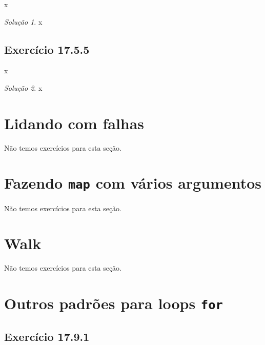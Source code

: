 \documentclass[
]{latex/krantz}
\theoremstyle{definition}
\theoremstyle{definition}
\theoremstyle{definition}
\theoremstyle{definition}
\theoremstyle{remark}
\newtheorem*{solution}{Solução}
\begin{document}
x

\begin{solution}
x
\end{solution}

\hypertarget{exr17-5-5}{%
\subsection*{Exercício 17.5.5}\label{exr17-5-5}}

x

\begin{solution}
x
\end{solution}

\hypertarget{lidando-com-falhas}{%
\section{Lidando com falhas}\label{lidando-com-falhas}}

Não temos exercícios para esta seção.

\hypertarget{fazendo-map-com-vuxe1rios-argumentos}{%
\section{\texorpdfstring{Fazendo \texttt{map} com vários argumentos}{Fazendo map com vários argumentos}}\label{fazendo-map-com-vuxe1rios-argumentos}}

Não temos exercícios para esta seção.

\hypertarget{walk}{%
\section{Walk}\label{walk}}

Não temos exercícios para esta seção.

\hypertarget{outros-padruxf5es-para-loops-for}{%
\section{\texorpdfstring{Outros padrões para loops \texttt{for}}{Outros padrões para loops for}}\label{outros-padruxf5es-para-loops-for}}

\hypertarget{exr17-9-1}{%
\subsection*{Exercício 17.9.1}\label{exr17-9-1}}
\end{document}

